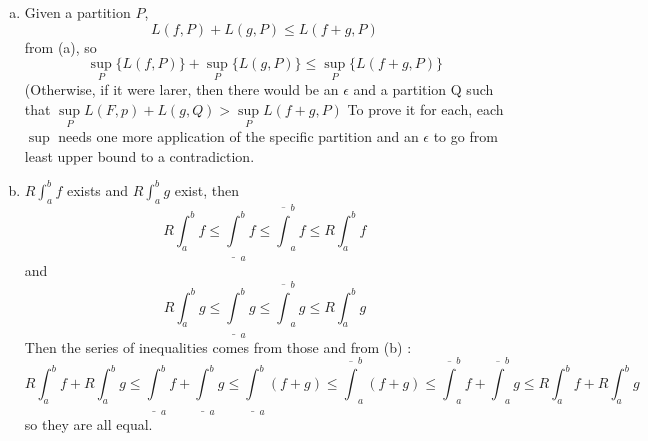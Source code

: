 \documentclass[11pt,oneside]{article}
\numberwithin{equation}{section}
\theoremstyle{definition}
\newtheorem{exercise}{Exercise}
\begin{document}
\begin{solution}
\begin{enumerate}[(a)]
\item
  Given a partition $P$,
  $$
  L(f, P) + L(g, P) \leq L( f + g, P)
  $$
  from (a), so
  $$
  \sup \limits_{P} \{ L(f, P) \} + \sup \limits_ { P} \{ L(g, P) \} \leq \sup \limits_{P} \{ L(f + g, P) \}
  $$
  (Otherwise, if it were larer, then there would be an $ \epsilon $ and a partition Q such that
  $\sup \limits_{P} L(F, p) + L(g, Q) > \sup \limits_{P} L(f + g, P)$
  To prove it for each, each $\sup$ needs one more application of the specific partition and an $\epsilon$ to
  go from least upper bound to a contradiction.  
\item
  $R \int _ a ^ b f$ exists and $ R \int _a ^ b g $ exist, then
  $$
 R \int _a ^b  f  \leq \underline \int _a ^b f \leq \overline \int _a ^b f \leq R \int _a ^b  f
  $$
  and 
  $$
  R \int _a ^b  g \leq \underline \int _a ^b g \leq \overline \int _a ^b g \leq R \int _a ^b  g
  $$
  Then the series of inequalities comes from those and from (b) :
  $$
  R \int _a ^b f + R \int _a ^b g \leq \underline \int  _a ^b f + \underline \int _a ^b g \leq
  \underline \int _a ^b ( f + g ) \leq \overline \int _a ^b ( f + g ) \leq \overline \int _a ^b f + \overline \int _a ^b g \leq R \int _a ^b f + R \int _a ^b g
  $$
  so they are all equal.  
\end{enumerate}
\end{solution}

\begin{comment}
\begin{exercise}
  problem
\end{exercise}
\begin{solution}
\begin{enumerate}[(a)]
\item
  first answer
\end{enumerate}
\end{solution}
\end{comment}
\end{document}
